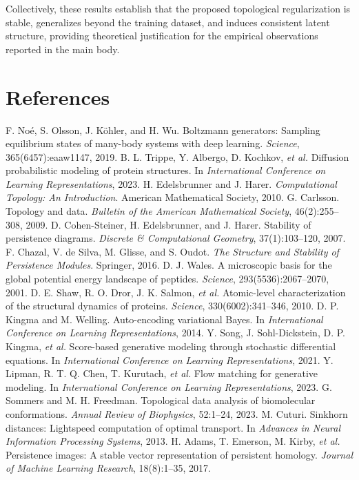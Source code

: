\documentclass[11pt]{article}
\theoremstyle{definition}
\begin{document}
Collectively, these results establish that the proposed topological regularization is stable, generalizes beyond the training dataset, and induces consistent latent structure, providing theoretical justification for the empirical observations reported in the main body.

\section*{References}
\begin{thebibliography}{99}
 F. No{\'e}, S. Olsson, J. K{\"o}hler, and H. Wu. Boltzmann generators: Sampling equilibrium states of many-body systems with deep learning. \emph{Science}, 365(6457):eaaw1147, 2019.
 B. L. Trippe, Y. Albergo, D. Kochkov, \emph{et al.} Diffusion probabilistic modeling of protein structures. In \emph{International Conference on Learning Representations}, 2023.
 H. Edelsbrunner and J. Harer. \emph{Computational Topology: An Introduction}. American Mathematical Society, 2010.
 G. Carlsson. Topology and data. \emph{Bulletin of the American Mathematical Society}, 46(2):255--308, 2009.
 D. Cohen-Steiner, H. Edelsbrunner, and J. Harer. Stability of persistence diagrams. \emph{Discrete \& Computational Geometry}, 37(1):103--120, 2007.
 F. Chazal, V. de Silva, M. Glisse, and S. Oudot. \emph{The Structure and Stability of Persistence Modules}. Springer, 2016.
 D. J. Wales. A microscopic basis for the global potential energy landscape of peptides. \emph{Science}, 293(5536):2067--2070, 2001.
 D. E. Shaw, R. O. Dror, J. K. Salmon, \emph{et al.} Atomic-level characterization of the structural dynamics of proteins. \emph{Science}, 330(6002):341--346, 2010.
 D. P. Kingma and M. Welling. Auto-encoding variational Bayes. In \emph{International Conference on Learning Representations}, 2014.
 Y. Song, J. Sohl-Dickstein, D. P. Kingma, \emph{et al.} Score-based generative modeling through stochastic differential equations. In \emph{International Conference on Learning Representations}, 2021.
 Y. Lipman, R. T. Q. Chen, T. Kurutach, \emph{et al.} Flow matching for generative modeling. In \emph{International Conference on Learning Representations}, 2023.
 G. Sommers and M. H. Freedman. Topological data analysis of biomolecular conformations. \emph{Annual Review of Biophysics}, 52:1--24, 2023.
 M. Cuturi. Sinkhorn distances: Lightspeed computation of optimal transport. In \emph{Advances in Neural Information Processing Systems}, 2013.
 H. Adams, T. Emerson, M. Kirby, \emph{et al.} Persistence images: A stable vector representation of persistent homology. \emph{Journal of Machine Learning Research}, 18(8):1--35, 2017.
\end{thebibliography}
\end{document}
